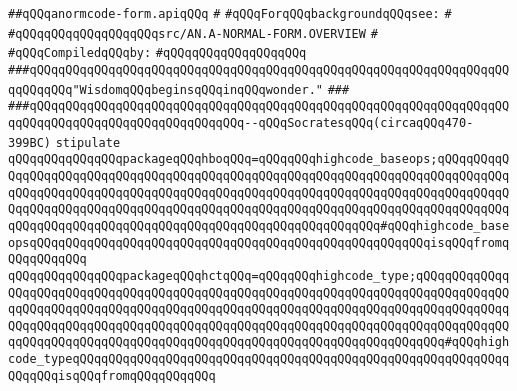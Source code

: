 \label{src/lib/compiler/back/top/anormcode/anormcode-form.api}
\verb|##qQQqanormcode-form.apiqQQq|\newline
\verb|#|\newline
\verb|#qQQqForqQQqbackgroundqQQqsee:|\newline
\verb|#|\newline
\verb|#qQQqqQQqqQQqqQQqqQQqsrc/AN.A-NORMAL-FORM.OVERVIEW|\newline
\verb|#|\newline
\newline
\verb|#qQQqCompiledqQQqby:|\newline
\verb|#qQQqqQQqqQQqqQQqqQQq|\newline
\newline
\newline
\newline
\newline
\verb|###qQQqqQQqqQQqqQQqqQQqqQQqqQQqqQQqqQQqqQQqqQQqqQQqqQQqqQQqqQQqqQQqqQQqqQQqqQQq"WisdomqQQqbeginsqQQqinqQQqwonder."|\newline
\verb|###|\newline
\verb|###qQQqqQQqqQQqqQQqqQQqqQQqqQQqqQQqqQQqqQQqqQQqqQQqqQQqqQQqqQQqqQQqqQQqqQQqqQQqqQQqqQQqqQQqqQQqqQQqqQQq--qQQqSocratesqQQq(circaqQQq470-399BC)|\newline
\newline
\newline
\newline
\verb|stipulate|\newline
\verb|qQQqqQQqqQQqqQQqpackageqQQqhboqQQq=qQQqqQQqhighcode_baseops;qQQqqQQqqQQqqQQqqQQqqQQqqQQqqQQqqQQqqQQqqQQqqQQqqQQqqQQqqQQqqQQqqQQqqQQqqQQqqQQqqQQqqQQqqQQqqQQqqQQqqQQqqQQqqQQqqQQqqQQqqQQqqQQqqQQqqQQqqQQqqQQqqQQqqQQqqQQqqQQqqQQqqQQqqQQqqQQqqQQqqQQqqQQqqQQqqQQqqQQqqQQqqQQqqQQqqQQqqQQqqQQqqQQqqQQqqQQqqQQqqQQqqQQqqQQqqQQqqQQqqQQqqQQqqQQq#qQQqhighcode_baseopsqQQqqQQqqQQqqQQqqQQqqQQqqQQqqQQqqQQqqQQqqQQqqQQqqQQqqQQqisqQQqfromqQQqqQQqqQQq|\newline
\verb|qQQqqQQqqQQqqQQqpackageqQQqhctqQQq=qQQqqQQqhighcode_type;qQQqqQQqqQQqqQQqqQQqqQQqqQQqqQQqqQQqqQQqqQQqqQQqqQQqqQQqqQQqqQQqqQQqqQQqqQQqqQQqqQQqqQQqqQQqqQQqqQQqqQQqqQQqqQQqqQQqqQQqqQQqqQQqqQQqqQQqqQQqqQQqqQQqqQQqqQQqqQQqqQQqqQQqqQQqqQQqqQQqqQQqqQQqqQQqqQQqqQQqqQQqqQQqqQQqqQQqqQQqqQQqqQQqqQQqqQQqqQQqqQQqqQQqqQQqqQQqqQQqqQQqqQQqqQQqqQQqqQQqqQQq#qQQqhighcode_typeqQQqqQQqqQQqqQQqqQQqqQQqqQQqqQQqqQQqqQQqqQQqqQQqqQQqqQQqqQQqqQQqqQQqisqQQqfromqQQqqQQqqQQq|\newline
